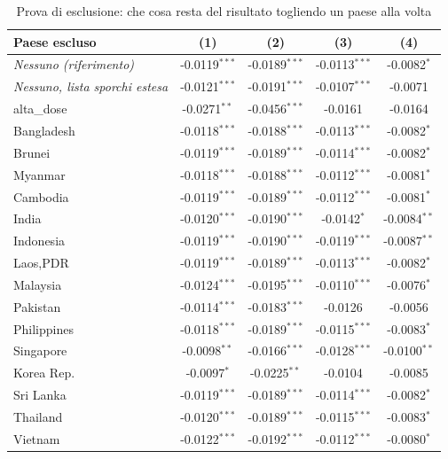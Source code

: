 \begin{table}[htbp]
\centering
\footnotesize
\caption{Prova di esclusione: che cosa resta del risultato togliendo un paese alla volta}
\label{tab:loo}
\begin{threeparttable}
\begin{tabular}{lcccc}
\toprule
Paese escluso & (1) & (2) & (3) & (4) \\
\midrule
\textit{Nessuno (riferimento)} & -0.0119$^{***}$ & -0.0189$^{***}$ & -0.0113$^{***}$ & -0.0082$^{*}$ \\
\textit{Nessuno, lista sporchi estesa} & -0.0121$^{***}$ & -0.0191$^{***}$ & -0.0107$^{***}$ & -0.0071 \\
\midrule
alta\_dose & -0.0271$^{**}$ & -0.0456$^{***}$ & -0.0161 & -0.0164 \\
Bangladesh & -0.0118$^{***}$ & -0.0188$^{***}$ & -0.0113$^{***}$ & -0.0082$^{*}$ \\
Brunei & -0.0119$^{***}$ & -0.0189$^{***}$ & -0.0114$^{***}$ & -0.0082$^{*}$ \\
Myanmar & -0.0118$^{***}$ & -0.0188$^{***}$ & -0.0112$^{***}$ & -0.0081$^{*}$ \\
Cambodia & -0.0119$^{***}$ & -0.0189$^{***}$ & -0.0112$^{***}$ & -0.0081$^{*}$ \\
India & -0.0120$^{***}$ & -0.0190$^{***}$ & -0.0142$^{*}$ & -0.0084$^{**}$ \\
Indonesia & -0.0119$^{***}$ & -0.0190$^{***}$ & -0.0119$^{***}$ & -0.0087$^{**}$ \\
Laos,PDR & -0.0119$^{***}$ & -0.0189$^{***}$ & -0.0113$^{***}$ & -0.0082$^{*}$ \\
Malaysia & -0.0124$^{***}$ & -0.0195$^{***}$ & -0.0110$^{***}$ & -0.0076$^{*}$ \\
Pakistan & -0.0114$^{***}$ & -0.0183$^{***}$ & -0.0126 & -0.0056 \\
Philippines & -0.0118$^{***}$ & -0.0189$^{***}$ & -0.0115$^{***}$ & -0.0083$^{*}$ \\
Singapore & -0.0098$^{**}$ & -0.0166$^{***}$ & -0.0128$^{***}$ & -0.0100$^{**}$ \\
Korea Rep. & -0.0097$^{*}$ & -0.0225$^{**}$ & -0.0104 & -0.0085 \\
Sri Lanka & -0.0119$^{***}$ & -0.0189$^{***}$ & -0.0114$^{***}$ & -0.0082$^{*}$ \\
Thailand & -0.0120$^{***}$ & -0.0189$^{***}$ & -0.0115$^{***}$ & -0.0083$^{*}$ \\
Vietnam & -0.0122$^{***}$ & -0.0192$^{***}$ & -0.0112$^{***}$ & -0.0080$^{*}$ \\

\end{tabular}
\end{threeparttable}
\end{table}
